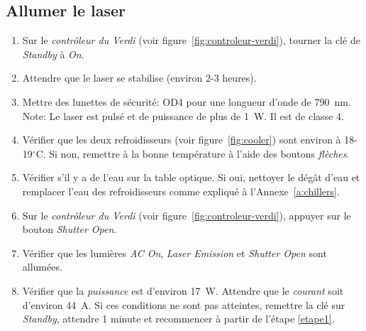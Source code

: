 \subsection{Allumer le laser}
\label{ssec:allumer_le_laser}
\begin{enumerate}
    \item \label{etape1} Sur le \textit{contrôleur du Verdi} (voir figure~\ref{fig:controleur-verdi}), tourner la clé de \textit{Standby} à \textit{On}.
    \item Attendre que le laser se stabilise (environ 2-3 heures).
    \item Mettre des lunettes de sécurité: OD4 pour une longueur d'onde de 790~nm. 
    \\ Note: Le laser est pulsé et de puissance de plus de 1~W. Il est de classe 4.
    \item Vérifier que les deux refroidisseurs (voir figure~\ref{fig:cooler}) sont environ à 18-19$^\circ$C.
    Si non, remettre à la bonne température à l'aide des boutons \textit{flèches}.
    \item Vérifier s'il y a de l'eau sur la table optique. Si oui, nettoyer le dégât d'eau et remplacer l'eau des refroidisseurs comme expliqué à l'Annexe~\ref{a:chillers}.
    \item Sur le \textit{contrôleur du Verdi} (voir figure~\ref{fig:controleur-verdi}), appuyer sur le bouton \textit{Shutter Open}.
    \item Vérifier que les lumières \textit{AC On}, \textit{Laser Emission} et \textit{Shutter Open} sont allumées.
    \item Vérifier que la \textit{puissance} est d'environ 17~W. Attendre que le \textit{courant} soit d'environ 44~A. Si ces conditions ne sont pas atteintes, remettre la clé sur \textit{Standby}, attendre 1 minute et recommencer à partir de l'étape \ref{etape1}.
\end{enumerate}